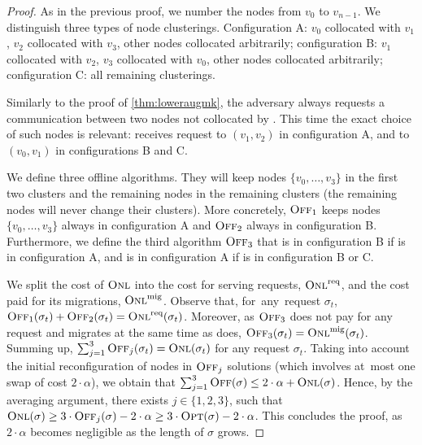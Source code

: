 \begin{proof} As in the previous proof, we number the nodes from $v_0$ to
$v_{n-1}$. We distinguish three types of node clusterings. Configuration A:
$v_0$ collocated with $v_1$, $v_2$ collocated with $v_3$, other nodes
collocated arbitrarily; configuration B: $v_1$ collocated with $v_2$, $v_3$
collocated with $v_0$, other nodes collocated arbitrarily; configuration C:
all remaining clusterings.

Similarly to the proof of \ref{thm:loweraugmk}, the adversary always
requests a communication between two nodes not collocated by \ONL.
This time the exact choice of such nodes is relevant: \ONL receives request to
$(v_1,v_2)$ in configuration A, and to $(v_0,v_1)$ in configurations B and C.

We define three offline algorithms. They will keep nodes
$\{v_0,\ldots,v_3\}$ in the first two clusters and the remaining nodes in the
remaining clusters (the remaining nodes will never change their clusters). 
More concretely, $\textsc{Off}_1$ keeps nodes $\{v_0,\ldots,v_3\}$ always in
configuration A and $\textsc{Off}_2$ always in configuration B. Furthermore, we define
the third algorithm $\textsc{Off}_3$ that is in configuration B if \ONL is in
configuration A, and is in configuration A if \ONL is in configuration B or C.

We split the cost of $\textsc{Onl}$ into the cost for serving requests, $\textsc{Onl}^\textnormal{req}$, and
the cost paid for its migrations, $\textsc{Onl}^\textnormal{mig}$. Observe that, for~any~request
$\sigma_t$, $\textsc{Off}_1(\sigma_t) + \textsc{Off}_2(\sigma_t) = \textsc{Onl}^\textnormal{req}(\sigma_t)$.
Moreover, as $\textsc{Off}_3$ does not pay for any request and migrates at the same
time as \ONL does, $\textsc{Off}_3(\sigma_t) = \textsc{Onl}^\textnormal{mig}(\sigma_t)$. Summing up,
$\sum_{j=1}^3 \textsc{Off}_j(\sigma_t) = \textsc{Onl}(\sigma_t)$ for any request $\sigma_t$.
Taking into account the initial reconfiguration of nodes in $\textsc{Off}_j$ solutions
(which involves at~most one swap of cost $2 \cdot \alpha$), we obtain that
$\sum_{j=1}^3 \textsc{Off}(\sigma) \leq 2 \cdot \alpha + \textsc{Onl}(\sigma)$. Hence, by the
averaging argument, there exists $j \in \{1,2,3\}$, such that $\textsc{Onl}(\sigma)
\geq 3 \cdot \textsc{Off}_j(\sigma) - 2 \cdot \alpha \geq 3 \cdot \textsc{Opt}(\sigma) - 
2 \cdot \alpha$. This concludes the proof, as $2 \cdot \alpha$ becomes
negligible as the length of $\sigma$ grows.
\end{proof}

